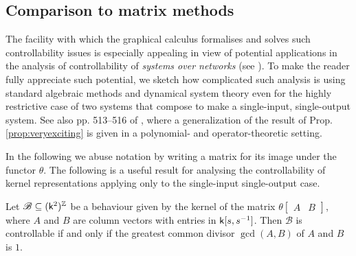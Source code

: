 \subsection{Comparison to matrix methods}
The facility with which the graphical calculus formalises and solves such
controllability issues is especially appealing in view of potential applications
in the analysis of controllability of \emph{systems over networks} (see
\cite{OFM}). To make the reader fully appreciate such potential, we sketch how
complicated such analysis is using standard algebraic methods and
dynamical system theory even for the highly restrictive case of two systems that
compose to make a single-input, single-output system.  See also pp. 513--516 of
\cite{FH}, where a generalization of the result of Prop. \ref{prop:veryexciting}
is given in a polynomial- and operator-theoretic setting. 

In the following we abuse notation by writing a matrix for its image under the
functor $\theta$.  The following is a useful result for analysing the
controllability of kernel representations applying only to the single-input
single-output case.

\begin{proposition} \label{prop.controlkernel}
  Let $\mathscr B \subseteq (\mathsf{k}^2)^{\mathbb Z}$ be a behaviour given by the kernel of the
  matrix $\theta\begin{bmatrix} A & B\end{bmatrix}$, where $A$ and $B$ are column
  vectors with entries in $\mathsf{k}[s,s^{-1}]$. Then $\mathscr B$ is controllable if
  and only if the greatest common divisor $\gcd(A,B)$ of $A$ and $B$ is $1$.
\end{proposition}

